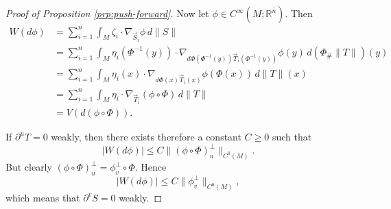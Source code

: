 \documentclass[a4paper]{article}
\newcommand{\R}{\mathbb{R}}
\newcommand{\ndim}{{\bar{n}}}
\theoremstyle{definition}
\theoremstyle{remark}
\begin{document}
\begin{proof}[Proof of Proposition \ref{prp:push-forward}]
Now let $\phi \in C^\infty(M; \R^\ndim)$. Then
\[
\begin{split}
W(d\phi) & = \sum_{i = 1}^n \int_M \zeta_i \cdot \nabla_{\vec{S}_i} \phi \, d\|S\| \\
& = \sum_{i = 1}^n \int_M \eta_i(\Phi^{-1}(y)) \cdot \nabla_{d\Phi(\Phi^{-1}(y)) \vec{T}_i(\Phi^{-1}(y))} \phi(y) \, d(\Phi_\# \|T\|)(y) \\
& = \sum_{i = 1}^n \int_M \eta_i(x) \cdot \nabla_{d\Phi(x) \vec{T}_i(x)} \phi(\Phi(x)) \, d\|T\|(x) \\
& = \sum_{i = 1}^n \int_M \eta_i \cdot \nabla_{\vec{T}_i} (\phi \circ \Phi) \, d\|T\| \\
& = V(d(\phi \circ \Phi)).
\end{split}
\]

If $\partial^u T = 0$ weakly, then there exists therefore a constant $C \ge 0$ such that
\[
|W(d\phi)| \le C\|(\phi \circ \Phi)_u^\perp\|_{C^0(M)}.
\]
But clearly $(\phi \circ \Phi)_u^\perp = \phi_v^\perp \circ \Phi$. Hence
\[
|W(d\phi)| \le C\|\phi_v^\perp\|_{C^0(M)},
\]
which means that $\partial^v S = 0$ weakly.
\end{proof}
\end{document}
